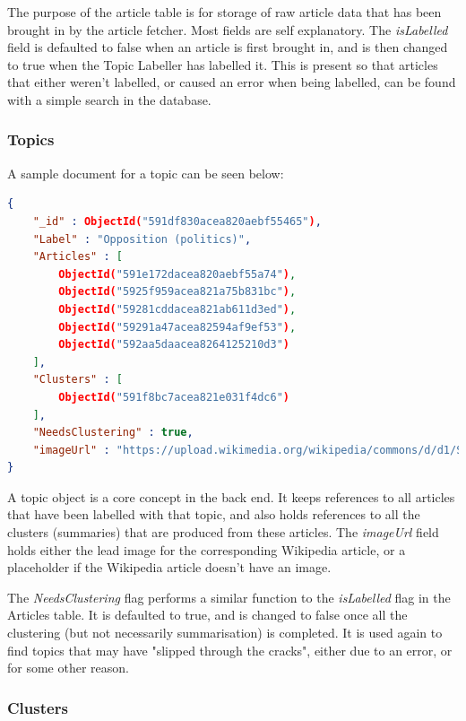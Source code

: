 \documentclass[12pt]{article}
\begin{document}
The purpose of the article table is for storage of raw article data that has been brought in by the article fetcher. Most fields are self explanatory. The \emph{isLabelled} field is defaulted to false when an article is first brought in, and is then changed to true when the Topic Labeller has labelled it. This is present so that articles that either weren't labelled, or caused an error when being labelled, can be found with a simple search in the database.

\subsubsection{Topics}

A sample document for a topic can be seen below:

\begin{lstlisting}[language=json, firstnumber=1, caption={A sample document in the Topics table}]
{
    "_id" : ObjectId("591df830acea820aebf55465"),
    "Label" : "Opposition (politics)",
    "Articles" : [ 
        ObjectId("591e172dacea820aebf55a74"), 
        ObjectId("5925f959acea821a75b831bc"), 
        ObjectId("59281cddacea821ab611d3ed"), 
        ObjectId("59291a47acea82594af9ef53"), 
        ObjectId("592aa5daacea8264125210d3")
    ],
    "Clusters" : [ 
        ObjectId("591f8bc7acea821e031f4dc6")
    ],
    "NeedsClustering" : true,
    "imageUrl" : "https://upload.wikimedia.org/wikipedia/commons/d/d1/Stand_in_opposition_city_hall_boston.jpg"
}
\end{lstlisting}

A topic object is a core concept in the back end. It keeps references to all articles that have been labelled with that topic, and also holds references to all the clusters (summaries) that are produced from these articles. The \emph{imageUrl} field holds either the lead image for the corresponding Wikipedia article, or a placeholder if the Wikipedia article doesn't have an image. 

The \emph{NeedsClustering} flag performs a similar function to the \emph{isLabelled} flag in the Articles table. It is defaulted to true, and is changed to false once all the clustering (but not necessarily summarisation) is completed. It is used again to find topics that may have "slipped through the cracks", either due to an error, or for some other reason. 

\subsubsection{Clusters}
\end{document}
